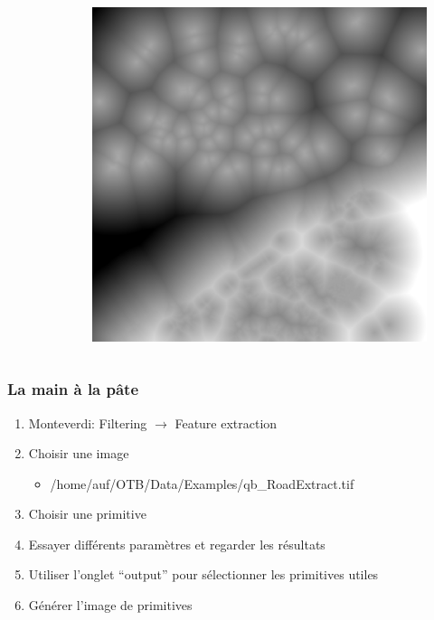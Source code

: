 \documentclass[compress,handout]{beamer}
\begin{document}
\begin{frame}
\begin{columns}
\begin{column}{0.32\textwidth}
\begin{figure}[]
\end{figure}
\end{column}
\begin{column}{0.32\textwidth}
\begin{figure}[]
  \includegraphics[width=1.0\textwidth]{DistanceFromWater.jpg}
\end{figure}
\end{column}
\end{columns}
\end{frame}


\begin{frame}
\frametitle{La main à la pâte}
\begin{enumerate}
\item Monteverdi: Filtering $\rightarrow$ Feature extraction
\item Choisir une image
  \begin{itemize}
  \item /home/auf/OTB/Data/Examples/qb\_RoadExtract.tif
  \end{itemize}
\item Choisir une primitive
\item Essayer différents paramètres et regarder les résultats
\item Utiliser l'onglet ``output'' pour sélectionner les primitives utiles
\item Générer l'image de primitives
\end{enumerate}

\end{frame}
\end{document}
